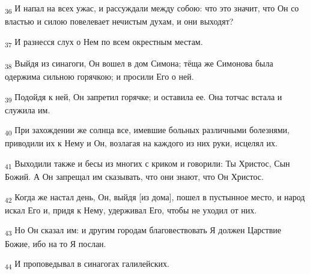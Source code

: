 \begin{tcolorbox}
\textsubscript{36} И напал на всех ужас, и рассуждали между собою: что это значит, что Он со властью и силою повелевает нечистым духам, и они выходят?
\end{tcolorbox}
\begin{tcolorbox}
\textsubscript{37} И разнесся слух о Нем по всем окрестным местам.
\end{tcolorbox}
\begin{tcolorbox}
\textsubscript{38} Выйдя из синагоги, Он вошел в дом Симона; тёща же Симонова была одержима сильною горячкою; и просили Его о ней.
\end{tcolorbox}
\begin{tcolorbox}
\textsubscript{39} Подойдя к ней, Он запретил горячке; и оставила ее. Она тотчас встала и служила им.
\end{tcolorbox}
\begin{tcolorbox}
\textsubscript{40} При захождении же солнца все, имевшие больных различными болезнями, приводили их к Нему и Он, возлагая на каждого из них руки, исцелял их.
\end{tcolorbox}
\begin{tcolorbox}
\textsubscript{41} Выходили также и бесы из многих с криком и говорили: Ты Христос, Сын Божий. А Он запрещал им сказывать, что они знают, что Он Христос.
\end{tcolorbox}
\begin{tcolorbox}
\textsubscript{42} Когда же настал день, Он, выйдя [из дома], пошел в пустынное место, и народ искал Его и, придя к Нему, удерживал Его, чтобы не уходил от них.
\end{tcolorbox}
\begin{tcolorbox}
\textsubscript{43} Но Он сказал им: и другим городам благовествовать Я должен Царствие Божие, ибо на то Я послан.
\end{tcolorbox}
\begin{tcolorbox}
\textsubscript{44} И проповедывал в синагогах галилейских.
\end{tcolorbox}
